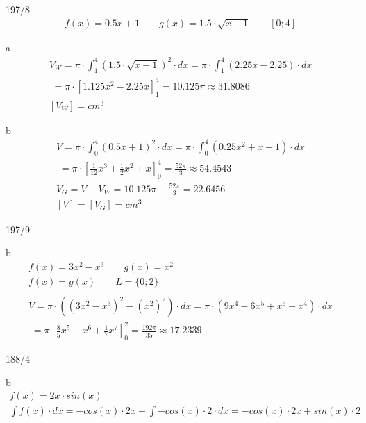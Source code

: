 \begin{exercise}{197/8}
  \begin{gather*}
    f(x) = 0.5x + 1 \qquad g(x) = 1.5 \cdot \sqrt{x - 1} \qquad \left[0; 4\right]
  \end{gather*}
  \item [a]
  \begin{gather*}
    V_W = \pi \cdot \int_1^4 (1.5 \cdot \sqrt{x - 1})^2 \cdot dx = \pi \cdot \int_1^4 (2.25x - 2.25) \cdot dx \\
    \;= \pi \cdot \left[1.125x^2 - 2.25x\right]_1^4 = 10.125\pi \approx 31.8086 \\
    [V_W] = cm^3
  \end{gather*}
  \item [b]
  \begin{gather*}
    V = \pi \cdot \int_0^4 (0.5x + 1)^2 \cdot dx = \pi \cdot \int_0^4 (0.25x^2 + x + 1) \cdot dx \\
    \;= \pi \cdot \left[\frac{1}{12}x^3 + \frac{1}{2}x^2 + x\right]_0^4 = \frac{52\pi}{3} \approx 54.4543 \\
    V_G = V - V_W = 10.125\pi - \frac{52\pi}{3} = 22.6456 \\
    [V] = [V_G] = cm^3
  \end{gather*}
\end{exercise}
\begin{exercise}{197/9}
  \item [b]
  \begin{gather*}
    f(x) = 3x^2 - x^3 \qquad g(x) = x^2 \\
    f(x) = g(x) \qquad L = \{0; 2\} \\\\
    V = \pi \cdot ((3x^2 - x^3)^2 - (x^2)^2) \cdot dx = \pi \cdot (9x^4 - 6x^5 + x^6 - x^4) \cdot dx \\
    \;= \pi \left[\frac{8}{5}x^5 - x^6 + \frac{1}{7}x^7\right]_0^2 = \frac{192\pi}{35} \approx 17.2339
  \end{gather*}
\end{exercise}
\begin{exercise}{188/4}
  \item [b]
  \begin{gather*}
    f(x) = 2x \cdot sin(x) \\
    \int f(x) \cdot dx = -cos(x) \cdot 2x - \int -cos(x) \cdot 2 \cdot dx = -cos(x) \cdot 2x + sin(x) \cdot 2
  \end{gather*}
\end{exercise}
